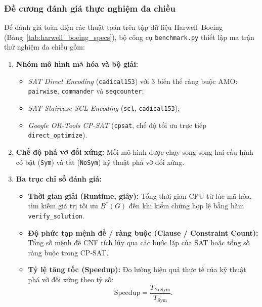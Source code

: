 \documentclass[a4paper,fleqn]{cas-sc}
\begin{document}
\subsubsection{Đề cương đánh giá thực nghiệm đa chiều}
Để đánh giá toàn diện các thuật toán trên tập dữ liệu Harwell--Boeing (Bảng~\ref{tab:harwell_boeing_specs}), bộ công cụ \texttt{benchmark.py} thiết lập ma trận thử nghiệm đa chiều gồm:
\begin{enumerate}
    \item \textbf{Nhóm mô hình mã hóa và bộ giải:}
    \begin{itemize}
        \item \textit{SAT Direct Encoding} (\texttt{cadical153}) với 3 biến thể ràng buộc AMO: \texttt{pairwise}, \texttt{commander} và \texttt{seqcounter};
        \item \textit{SAT Staircase SCL Encoding} (\texttt{scl}, \texttt{cadical153});
        \item \textit{Google OR-Tools CP-SAT} (\texttt{cpsat}, chế độ tối ưu trực tiếp \texttt{direct\_optimize}).
    \end{itemize}
    \item \textbf{Chế độ phá vỡ đối xứng:} Mỗi mô hình được chạy song song hai cấu hình có bật (\texttt{Sym}) và tắt (\texttt{NoSym}) kỹ thuật phá vỡ đối xứng.
    \item \textbf{Ba trục chỉ số đánh giá:}
    \begin{itemize}
        \item \textbf{Thời gian giải (Runtime, giây):} Tổng thời gian CPU từ lúc mã hóa, tìm kiếm giá trị tối ưu $B^*(G)$ đến khi kiểm chứng hợp lệ bằng hàm \texttt{verify\_solution}.
        \item \textbf{Độ phức tạp mệnh đề / ràng buộc (Clause / Constraint Count):} Tổng số mệnh đề CNF tích lũy qua các bước lặp của SAT hoặc tổng số ràng buộc trong CP-SAT.
        \item \textbf{Tỷ lệ tăng tốc (Speedup):} Đo lường hiệu quả thực tế của kỹ thuật phá vỡ đối xứng theo tỷ số:
        \begin{equation}
            \text{Speedup} = \frac{T_{\text{NoSym}}}{T_{\text{Sym}}}.
        \end{equation}
    \end{itemize}
\end{enumerate}
\end{document}
